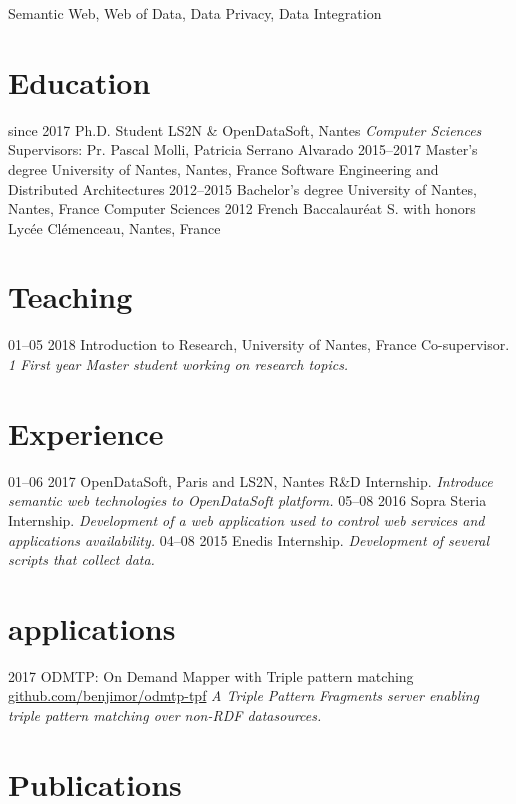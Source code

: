 \documentclass[]{friggeri-cv}
\begin{document}
Semantic Web, Web of Data, Data Privacy, Data Integration

\section{Education}

\begin{entrylist}
  \entry
    {since 2017}
    {Ph.D. Student}
    {LS2N \& OpenDataSoft, Nantes}
    {\emph{Computer Sciences}
    Supervisors: Pr. Pascal Molli, Patricia Serrano Alvarado}
  \entry
    {2015–2017}
    {Master’s degree}
    {University of Nantes, Nantes, France}
    {Software Engineering and Distributed Architectures}
  \entry
    {2012–2015}
    {Bachelor’s degree}
    {University of Nantes, Nantes, France}
    {Computer Sciences}
  \entry
    {2012}
    {French Baccalauréat S. with honors}
    {Lycée Clémenceau, Nantes, France}
    {}
\end{entrylist}

\section{Teaching}

\begin{entrylist}
  \entry
    {01–05 2018}
    {Introduction to Research, University of Nantes, France}
    {Co-supervisor.}
    {\emph{1 First year Master student working on research topics.}}
 \end{entrylist}

\section{Experience}

\begin{entrylist}
  \entry
    {01–06 2017}
    {OpenDataSoft, Paris and LS2N, Nantes}
    {R\&D Internship.}
    {\emph{Introduce semantic web technologies to OpenDataSoft platform.}}
  \entry
    {05–08 2016}
    {Sopra Steria}
    {Internship.}
    {\emph{Development of a web application used to control web services and applications availability.}}
  \entry
    {04–08 2015}
    {Enedis}
    {Internship.}
    {\emph{Development of several scripts that collect data.}}
\end{entrylist}

\section{applications}

\begin{entrylist}
  \entry
    {2017}
    {ODMTP: On Demand Mapper with Triple pattern matching\cite{moreau2017querying}}
    {\href{https://github.com/benjimor/odmtp-tpf}{github.com/benjimor/odmtp-tpf}}
    {\emph{A Triple Pattern Fragments server enabling triple pattern matching over non-RDF datasources.}}
\end{entrylist}

\section{Publications}

\nocite{*}
\printbibliography[sorting=chronological, heading=subbibliography, heading=none]
\end{document}
